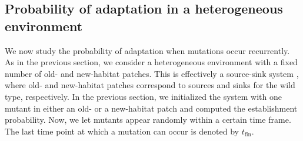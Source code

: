 \documentclass[11pt]{article}
\begin{document}
\subsection*{Probability of adaptation in a heterogeneous environment} \label{subsec:source_sink}

We now study the probability of adaptation when mutations occur recurrently. As in the previous section, we consider a heterogeneous environment with a fixed number of old- and new-habitat patches. This is effectively a source-sink system \citep{holt_1985,pulliam_1988}, where old- and new-habitat patches correspond to sources and sinks for the wild type, respectively. In the previous section, we initialized the system with one mutant in either an old- or a new-habitat patch and computed the establishment probability. Now, we let mutants appear randomly within a certain time frame. The last time point at which a mutation can occur is denoted by $t_{\text{fin}}$.
\end{document}

